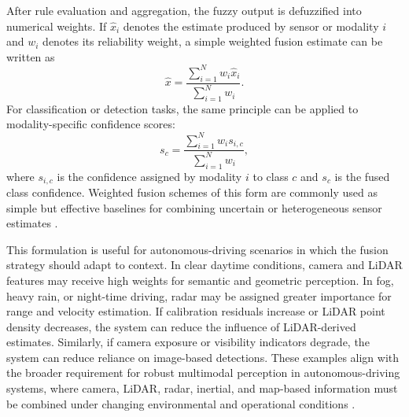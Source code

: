 \documentclass[11pt,oneside,openany]{book}
\begin{document}
After rule evaluation and aggregation, the fuzzy output is defuzzified into numerical weights. If $\hat{x}_i$ denotes the estimate produced by sensor or modality $i$ and $w_i$ denotes its reliability weight, a simple weighted fusion estimate can be written as
\begin{equation}
    \hat{x} =
    \frac{\sum_{i=1}^{N} w_i \hat{x}_i}
    {\sum_{i=1}^{N} w_i}.
\end{equation}
For classification or detection tasks, the same principle can be applied to modality-specific confidence scores:
\begin{equation}
    s_c =
    \frac{\sum_{i=1}^{N} w_i s_{i,c}}
    {\sum_{i=1}^{N} w_i},
\end{equation}
where $s_{i,c}$ is the confidence assigned by modality $i$ to class $c$ and $s_c$ is the fused class confidence. Weighted fusion schemes of this form are commonly used as simple but effective baselines for combining uncertain or heterogeneous sensor estimates \cite{hall_introduction_1997, khaleghi_multisensor_2013}.

This formulation is useful for autonomous-driving scenarios in which the fusion strategy should adapt to context. In clear daytime conditions, camera and LiDAR features may receive high weights for semantic and geometric perception. In fog, heavy rain, or night-time driving, radar may be assigned greater importance for range and velocity estimation. If calibration residuals increase or LiDAR point density decreases, the system can reduce the influence of LiDAR-derived estimates. Similarly, if camera exposure or visibility indicators degrade, the system can reduce reliance on image-based detections. These examples align with the broader requirement for robust multimodal perception in autonomous-driving systems, where camera, LiDAR, radar, inertial, and map-based information must be combined under changing environmental and operational conditions \cite{khaleghi_multisensor_2013, baltrusaitis_multimodal_2019}.
\end{document}
